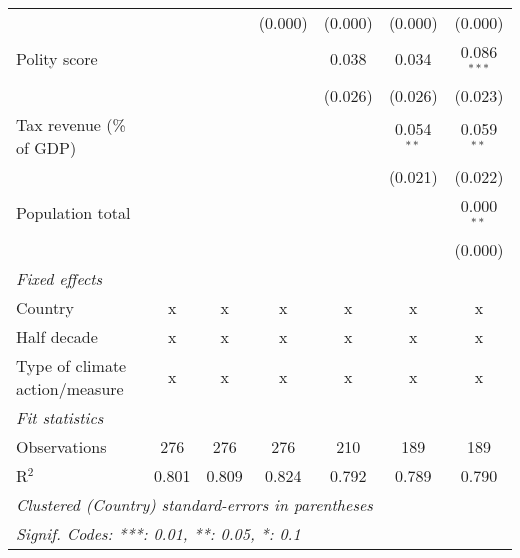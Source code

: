\begin{tabular}{lcccccc}
                                                                                           &         &               & (0.000)        & (0.000)        & (0.000)        & (0.000)\\   
   Polity score                                                                            &         &               &                & 0.038          & 0.034          & 0.086$^{***}$\\   
                                                                                           &         &               &                & (0.026)        & (0.026)        & (0.023)\\   
   Tax revenue (\% of GDP)                                                                 &         &               &                &                & 0.054$^{**}$   & 0.059$^{**}$\\   
                                                                                           &         &               &                &                & (0.021)        & (0.022)\\   
   Population total                                                                        &         &               &                &                &                & 0.000$^{**}$\\   
                                                                                           &         &               &                &                &                & (0.000)\\   
   \emph{Fixed effects}\\
   Country                                                                                 & x       & x             & x              & x              & x              & x\\  
   Half decade                                                                             & x       & x             & x              & x              & x              & x\\  
   Type of climate action/measure                                                          & x       & x             & x              & x              & x              & x\\  
   \midrule \emph{Fit statistics}\\
   Observations                                                                            & 276     & 276           & 276            & 210            & 189            & 189\\  
   R$^2$                                                                                   & 0.801   & 0.809         & 0.824          & 0.792          & 0.789          & 0.790\\  
   \midrule
   \multicolumn{7}{l}{\emph{Clustered (Country) standard-errors in parentheses}}\\
   \multicolumn{7}{l}{\emph{Signif. Codes: ***: 0.01, **: 0.05, *: 0.1}}\\
\end{tabular}
\par\endgroup


